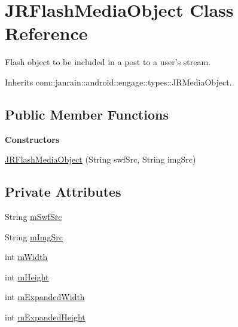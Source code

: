 \hypertarget{classcom_1_1janrain_1_1android_1_1engage_1_1types_1_1_j_r_flash_media_object}{
\section{JRFlashMediaObject Class Reference}
\label{classcom_1_1janrain_1_1android_1_1engage_1_1types_1_1_j_r_flash_media_object}
}


Flash object to be included in a post to a user's stream.  




Inherits com::janrain::android::engage::types::JRMediaObject.

\subsection*{Public Member Functions}
\begin{Indent}{\bf Constructors}\par
{\em \label{_amgrp559a25fdb98a7d1fd1c3771ac568d5e9}
 }\begin{DoxyCompactItemize}
\item 
\hyperlink{classcom_1_1janrain_1_1android_1_1engage_1_1types_1_1_j_r_flash_media_object_a6517406c8905055f31f287bb63a94b8a}{JRFlashMediaObject} (String swfSrc, String imgSrc)
\end{DoxyCompactItemize}
\end{Indent}
\subsection*{Private Attributes}
\begin{DoxyCompactItemize}
\item 
String \hyperlink{classcom_1_1janrain_1_1android_1_1engage_1_1types_1_1_j_r_flash_media_object_a9b17f35d97f72efb09e749a042dfde9f}{mSwfSrc}
\item 
String \hyperlink{classcom_1_1janrain_1_1android_1_1engage_1_1types_1_1_j_r_flash_media_object_a41b79808af056e6c361bf90129f2f9e9}{mImgSrc}
\item 
int \hyperlink{classcom_1_1janrain_1_1android_1_1engage_1_1types_1_1_j_r_flash_media_object_aa39f004a83a206ca8644d441c792e45b}{mWidth}
\item 
int \hyperlink{classcom_1_1janrain_1_1android_1_1engage_1_1types_1_1_j_r_flash_media_object_a3d6a057795437ab1becbd09b09ea7a90}{mHeight}
\item 
int \hyperlink{classcom_1_1janrain_1_1android_1_1engage_1_1types_1_1_j_r_flash_media_object_a89c309c9877e843c2a151f91759be11b}{mExpandedWidth}
\item 
int \hyperlink{classcom_1_1janrain_1_1android_1_1engage_1_1types_1_1_j_r_flash_media_object_a43b25e7ecfdedf6ff98bde0e4b48c71c}{mExpandedHeight}
\end{DoxyCompactItemize}


